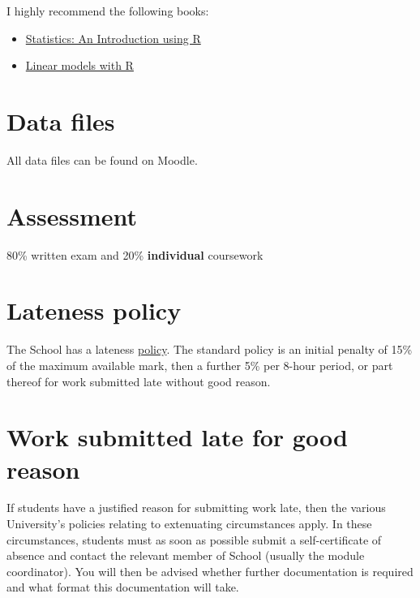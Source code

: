 \documentclass[
]{book}
\providecommand{\tightlist}{%
  \setlength{\itemsep}{0pt}\setlength{\parskip}{0pt}}
\theoremstyle{definition}
\theoremstyle{definition}
\theoremstyle{definition}
\theoremstyle{remark}
\begin{document}
I highly recommend the following books:

\begin{itemize}
\tightlist
\item
  \href{https://www.wiley.com/en-gb/Statistics\%3A+An+Introduction+using+R-p-9780470022986}{Statistics: An Introduction using R}
\item
  \href{https://www.crcpress.com/Linear-Models-with-R/Faraway/p/book/9781439887332}{Linear models with R}
\end{itemize}

\hypertarget{data-files}{%
\section*{Data files}\label{data-files}}

All data files can be found on Moodle.

\hypertarget{assessment}{%
\section*{Assessment}\label{assessment}}

80\% written exam and 20\% \textbf{individual} coursework

\hypertarget{lateness-policy}{%
\section*{Lateness policy}\label{lateness-policy}}

The School has a lateness \href{https://www.st-andrews.ac.uk/maths/current/ug/information/latepenalties/}{policy}. The standard policy is an initial penalty of 15\% of the maximum available mark, then a further 5\% per 8-hour period, or part thereof for work submitted late without good reason.

\hypertarget{work-submitted-late-for-good-reason}{%
\section*{Work submitted late for good reason}\label{work-submitted-late-for-good-reason}}

If students have a justified reason for submitting work late, then the various University's policies relating to extenuating circumstances apply. In these circumstances, students must as soon as possible submit a self-certificate of absence and contact the relevant member of School (usually the module coordinator). You will then be advised whether further documentation is required and what format this documentation will take.
\end{document}
